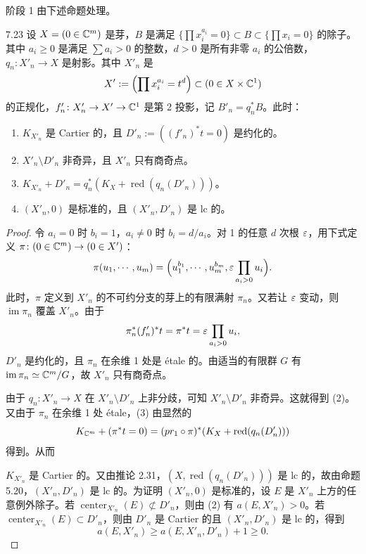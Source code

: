 阶段 1 由下述命题处理。

\begin{propositionp}{7.23}
设 $X=(0\in\mathbb{C}^m)$ 是芽，$B$ 是满足 $\{\prod x_i^{a_i}=0\}\subset B\subset\{\prod x_i=0\}$ 的除子。其中 $a_i\ge0$ 是满足 $\sum a_i>0$ 的整数，$d>0$ 是所有非零 $a_i$ 的公倍数，$q_n\colon X'_n\to X$ 是射影。其中 $X'_n$ 是
\[
X':=\Bigl(\prod x_i^{a_i}=t^d\Bigr)\subset(0\in X\times\mathbb{C}^1)
\]
的正规化，$f'_n\colon X'_n\to X'\to\mathbb{C}^1$ 是第 2 投影，记 $B'_n=q_n^*B$。此时：
\begin{enumerate}[label=(\arabic*),leftmargin=2.4em,itemsep=1pt,topsep=2pt,parsep=0pt]
\item $K_{X'_n}$ 是 Cartier 的，且 $D'_n:=((f'_n)^*t=0)$ 是约化的。
\item $X'_n\setminus D'_n$ 非奇异，且 $X'_n$ 只有商奇点。
\item $K_{X'_n}+D'_n=q_n^*(K_X+\operatorname{red}(q_n(D'_n)))$。
\item $(X'_n,0)$ 是标准的，且 $(X'_n,D'_n)$ 是 lc 的。
\end{enumerate}
\end{propositionp}

\begin{proof}
令 $a_i=0$ 时 $b_i=1$，$a_i\ne0$ 时 $b_i=d/a_i$。对 1 的任意 $d$ 次根 $\varepsilon$，用下式定义 $\pi\colon(0\in\mathbb{C}^m)\to(0\in X')$：
\[
\pi(u_1,\cdots,u_m)=\Bigl(u_1^{b_1},\cdots,u_m^{b_m},\varepsilon\prod_{a_i>0}u_i\Bigr).
\]
此时，$\pi$ 定义到 $X'_n$ 的不可约分支的芽上的有限满射 $\pi_n$。又若让 $\varepsilon$ 变动，则 $\operatorname{im}\pi_n$ 覆盖 $X'_n$。由于
\[
\pi_n^*(f'_n)^*t=\pi^*t=\varepsilon\prod_{a_i>0}u_i,
\]
$D'_n$ 是约化的，且 $\pi_n$ 在余维 1 处是 étale 的。由适当的有限群 $G$ 有 $\operatorname{im}\pi_n\simeq\mathbb{C}^m/G$，故 $X'_n$ 只有商奇点。

由于 $q_n\colon X'_n\to X$ 在 $X'_n\setminus D'_n$ 上非分歧，可知 $X'_n\setminus D'_n$ 非奇异。这就得到 (2)。又由于 $\pi_n$ 在余维 1 处 étale，(3) 由显然的
\[
K_{\mathbb{C}^m}+(\pi^*t=0)=(pr_1\circ\pi)^*(K_X+\operatorname{red}(q_n(D'_n)))
\]
得到。从而

$K_{X'_n}$ 是 Cartier 的。又由推论 2.31，$(X,\operatorname{red}(q_n(D'_n)))$ 是 lc 的，故由命题 5.20，$(X'_n,D'_n)$ 是 lc 的。为证明 $(X'_n,0)$ 是标准的，设 $E$ 是 $X'_n$ 上方的任意例外除子。若 $\operatorname{center}_{X'_n}(E)\not\subset D'_n$，则由 (2) 有 $a(E,X'_n)>0$。若 $\operatorname{center}_{X'_n}(E)\subset D'_n$，则由 $D'_n$ 是 Cartier 的且 $(X'_n,D'_n)$ 是 lc 的，得到
\[
a(E,X'_n)\ge a(E,X'_n,D'_n)+1\ge0.
\]
\end{proof}

